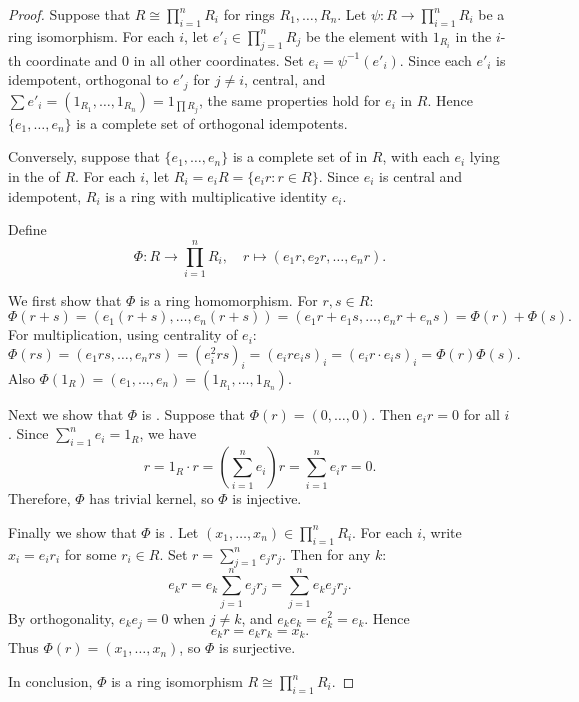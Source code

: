 \begin{proof}
    Suppose that $R \cong \prod_{i=1}^n R_i$ for rings $R_1,\ldots,R_n$. Let $\psi: R \to \prod_{i=1}^n R_i$ be a ring isomorphism. For each $i$, let $e'_i \in \prod_{j=1}^n R_j$ be the element with $1_{R_i}$ in the $i$-th coordinate and $0$ in all other coordinates. Set $e_i = \psi^{-1}(e'_i)$. Since each $e'_i$ is idempotent, orthogonal to $e'_j$ for $j \neq i$, central, and $\sum e'_i = (1_{R_1},\ldots,1_{R_n}) = 1_{\prod R_j}$, the same properties hold for $e_i$ in $R$. Hence $\{e_1,\ldots,e_n\}$ is a complete set of  orthogonal idempotents.

    Conversely, suppose that $\{e_1,\ldots,e_n\}$ is a complete set of  in $R$, with each $e_i$ lying in the  of $R$. For each $i$, let $R_i = e_i R = \{e_i r : r \in R\}$. Since $e_i$ is central and idempotent, $R_i$ is a ring with multiplicative identity $e_i$.

    Define
    $$\Phi: R \longrightarrow \prod_{i=1}^n R_i, \quad r \longmapsto (e_1 r, e_2 r, \ldots, e_n r).$$

    We first show that $\Phi$ is a ring homomorphism. For $r,s \in R$:
    $$\Phi(r+s) = (e_1(r+s),\ldots,e_n(r+s)) = (e_1 r + e_1 s,\ldots,e_n r + e_n s) = \Phi(r) + \Phi(s).$$
    For multiplication, using centrality of $e_i$:
    $$\Phi(rs) = (e_1 rs,\ldots,e_n rs) = (e_i^2 rs)_i = (e_i r e_i s)_i = (e_i r \cdot e_i s)_i = \Phi(r)\Phi(s).$$
    Also $\Phi(1_R) = (e_1,\ldots,e_n) = (1_{R_1},\ldots,1_{R_n})$.

    Next we show that $\Phi$ is . Suppose that $\Phi(r) = (0,\ldots,0)$. Then $e_i r = 0$ for all $i$. Since $\sum_{i=1}^n e_i = 1_R$, we have
    $$r = 1_R \cdot r = \left(\sum_{i=1}^n e_i\right)r = \sum_{i=1}^n e_i r = 0.$$
    Therefore, $\Phi$ has trivial kernel, so $\Phi$ is injective.
    

    Finally we show that $\Phi$ is . Let $(x_1,\ldots,x_n) \in \prod_{i=1}^n R_i$. For each $i$, write $x_i = e_i r_i$ for some $r_i \in R$. Set $r = \sum_{j=1}^n e_j r_j$. Then for any $k$:
    $$e_k r = e_k \sum_{j=1}^n e_j r_j = \sum_{j=1}^n e_k e_j r_j.$$
    By orthogonality, $e_k e_j = 0$ when $j \neq k$, and $e_k e_k = e_k^2 = e_k$. Hence
    $$e_k r = e_k r_k = x_k.$$
    Thus $\Phi(r) = (x_1,\ldots,x_n)$, so $\Phi$ is surjective.

    In conclusion, $\Phi$ is a ring isomorphism $R \cong \prod_{i=1}^n R_i$.
\end{proof}
